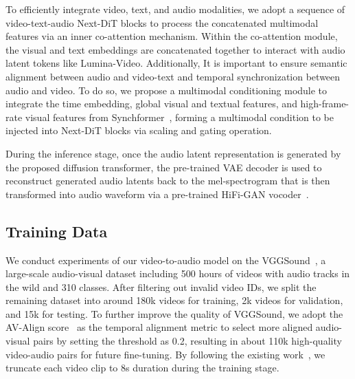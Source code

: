 To efficiently integrate video, text, and audio modalities, we adopt a sequence of video-text-audio Next-DiT blocks to process the concatenated multimodal features via an inner co-attention mechanism. Within the co-attention module, the visual and text embeddings are concatenated together to interact with audio latent tokens like Lumina-Video. Additionally, It is important to ensure semantic alignment between audio and video-text and temporal synchronization between audio and video. To do so, we propose a multimodal conditioning module to integrate the time embedding, global visual and textual features, and high-frame-rate visual features from Synchformer~\cite{iashin2024synchformer}, forming a multimodal condition to be injected into Next-DiT blocks via scaling and gating operation. 

During the inference stage, once the audio latent representation is generated by the proposed diffusion transformer, the pre-trained VAE decoder is used to reconstruct generated audio latents back to the mel-spectrogram that is then transformed into audio waveform via a pre-trained HiFi-GAN vocoder~\cite{kong2020hifi}. 

\subsection{Training Data}
We conduct experiments of our video-to-audio model on the VGGSound~\cite{chen2020vggsound}, a large-scale audio-visual dataset including 500 hours of videos with audio tracks in the wild and 310 classes. After filtering out invalid video IDs, we split the remaining dataset into around 180k videos for training, 2k videos for validation, and 15k for testing. To further improve the quality of VGGSound, we adopt the AV-Align score~\cite{yariv2024diverse} as the temporal alignment metric to select more aligned audio-visual pairs by setting the threshold as 0.2, resulting in about 110k high-quality video-audio pairs for future fine-tuning. By following the existing work~\cite{cheng2024taming}, we truncate each video clip to 8s duration during the training stage. 

